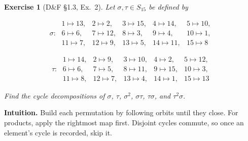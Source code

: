 \documentclass[12pt]{article}
\newtheorem{exercise}[theorem]{Exercise}
\theoremstyle{definition}
\begin{document}
\newpage

\begin{exercise}[D\&F §1.3, Ex.~2]
Let $\sigma,\tau\in S_{15}$ be defined by

\[
\sigma:\;
\begin{array}{lllll}
1\mapsto 13,&2\mapsto 2,&3\mapsto 15,&4\mapsto 14,&5\mapsto 10,\\
6\mapsto 6,&7\mapsto 12,&8\mapsto 3,&9\mapsto 4,&10\mapsto 1,\\
11\mapsto 7,&12\mapsto 9,&13\mapsto 5,&14\mapsto 11,&15\mapsto 8
\end{array}
\]

\[
\tau:\;
\begin{array}{lllll}
1\mapsto 14,&2\mapsto 9,&3\mapsto 10,&4\mapsto 2,&5\mapsto 12,\\
6\mapsto 6,&7\mapsto 5,&8\mapsto 11,&9\mapsto 15,&10\mapsto 3,\\
11\mapsto 8,&12\mapsto 7,&13\mapsto 4,&14\mapsto 1,&15\mapsto 13
\end{array}
\]


Find the cycle decompositions of $\sigma$, $\tau$, $\sigma^{2}$, $\sigma\tau$, $\tau\sigma$, and $\tau^{2}\sigma$.
\end{exercise}

\dotfill

\noindent
\textbf{Intuition.}
Build each permutation by following orbits until they close. For products, apply the rightmost map first.
Disjoint cycles commute, so once an element’s cycle is recorded, skip it.

\dotfill
\end{document}
